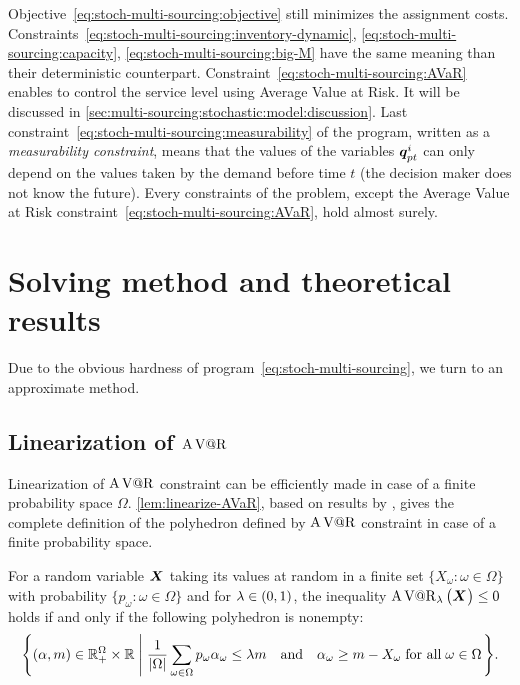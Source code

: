 Objective~\eqref{eq:stoch-multi-sourcing:objective} still minimizes the assignment costs.
Constraints~\eqref{eq:stoch-multi-sourcing:inventory-dynamic}, \eqref{eq:stoch-multi-sourcing:capacity}, \eqref{eq:stoch-multi-sourcing:big-M} have the same meaning than their deterministic counterpart.
Constraint~\eqref{eq:stoch-multi-sourcing:AVaR} enables to control the service level using Average Value at Risk.
It will be discussed in \cref{sec:multi-sourcing:stochastic:model:discussion}.
Last constraint~\eqref{eq:stoch-multi-sourcing:measurability} of the program, written as a {\em measurability constraint}, means that the values of the variables $\va\quantity_{pt}^i$ can only depend on the values taken by the demand before time $t$ (the decision maker does not know the future).
Every constraints of the problem, except the Average Value at Risk constraint~\eqref{eq:stoch-multi-sourcing:AVaR}, hold almost surely.




\section{Solving method and theoretical results}
\label{sec:multi-sourcing:stochastic:solving-method}


Due to the obvious hardness of program~\eqref{eq:stoch-multi-sourcing}, we turn to an approximate method.


\subsection{Linearization of $\operatorname{A\operatorname{V@R}}$}
\label{sec:multi-sourcing:stochastic:avar-linearization}


Linearization of $\operatorname{A\operatorname{V@R}}$ constraint can be efficiently made in case of a finite probability space $\Omega$.
\cref{lem:linearize-AVaR}, based on results by \citet{Rockafellar2000}, gives the complete definition of the polyhedron defined by $\operatorname{A\operatorname{V@R}}$ constraint in case of a finite probability space.


\begin{lem}\label{lem:linearize-AVaR}
For a random variable $\va X$ taking its values at random in a finite set $\{X_{\omega}\colon\omega\in\Omega\}$ with probability $\{p_{\omega}\colon\omega\in\Omega\}$ and for $\lambda\in\bracket{0,1}$, the inequality 
$\AVaR_{\lambda}\bracket{\va X} \le 0$ holds if and only if the following polyhedron is nonempty:
$$
\left\{
\bracket{\alpha,m}\in\RR_+^{\Omega}\times\RR
\;\left|\;
\frac{1}{\card{\Omega}}\sum_{\omega\in\Omega}p_{\omega}\alpha_{\omega}\leq \lambda m
\quad\mbox{\textup{and}}\quad
\alpha_{\omega}\geq m-X_{\omega}\;
\mbox{\textup{for all}}\;\omega\in\Omega
\right.
\right\}.
$$
\end{lem}


